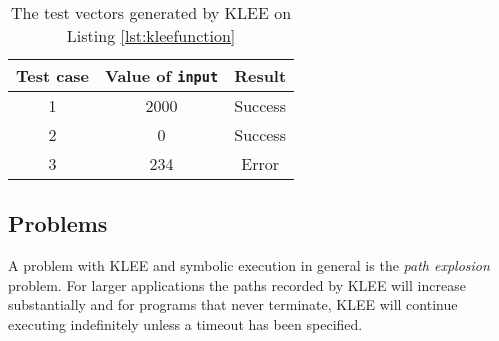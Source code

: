 \begin{table}[h]
    \centering
    \begin{tabular}{||c c c||}
        \hline
        Test case & Value of \texttt{input} & Result \\ [0.5ex]
        \hline\hline
        1 & 2000 & Success\\
        \hline
        2 & 0 & Success \\
        \hline
        3 & 234 & Error \\
        \hline
    \end{tabular}
    \caption{The test vectors generated by KLEE on Listing \ref{lst:kleefunction}}
    \label{tab:kleeexample}
\end{table}

\subsection{Problems}
A problem with KLEE and symbolic execution in general is the \emph{path
explosion} problem. For larger applications the paths recorded by KLEE will
increase substantially and for programs that never terminate, KLEE will
continue executing indefinitely unless a timeout has been specified.
